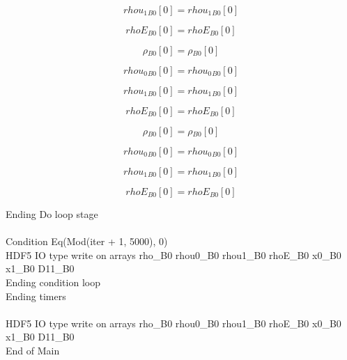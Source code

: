 \documentclass{article}
\begin{document}
\begin{dmath}{rhou_{1}{_{B0}}}[{0}] = {rhou_{1}{_{B0}}}[{0}]\end{dmath}

\begin{dmath}{rhoE{_{B0}}}[{0}] = {rhoE{_{B0}}}[{0}]\end{dmath}

\begin{dmath}{\rho{_{B0}}}[{0}] = {\rho{_{B0}}}[{0}]\end{dmath}

\begin{dmath}{rhou_{0}{_{B0}}}[{0}] = {rhou_{0}{_{B0}}}[{0}]\end{dmath}

\begin{dmath}{rhou_{1}{_{B0}}}[{0}] = {rhou_{1}{_{B0}}}[{0}]\end{dmath}

\begin{dmath}{rhoE{_{B0}}}[{0}] = {rhoE{_{B0}}}[{0}]\end{dmath}

\begin{dmath}{\rho{_{B0}}}[{0}] = {\rho{_{B0}}}[{0}]\end{dmath}

\begin{dmath}{rhou_{0}{_{B0}}}[{0}] = {rhou_{0}{_{B0}}}[{0}]\end{dmath}

\begin{dmath}{rhou_{1}{_{B0}}}[{0}] = {rhou_{1}{_{B0}}}[{0}]\end{dmath}

\begin{dmath}{rhoE{_{B0}}}[{0}] = {rhoE{_{B0}}}[{0}]\end{dmath}

\noindent Ending Do loop stage\\
\\\noindent Condition Eq(Mod(iter + 1, 5000), 0)\\\noindent HDF5 IO type write on arrays rho_B0 rhou0_B0 rhou1_B0 rhoE_B0 x0_B0 x1_B0 D11_B0\\\noindent Ending condition loop %
\\\noindent Ending timers\\
\\\noindent HDF5 IO type write on arrays rho_B0 rhou0_B0 rhou1_B0 rhoE_B0 x0_B0 x1_B0 D11_B0\\\noindent End of Main\\
\end{document}
